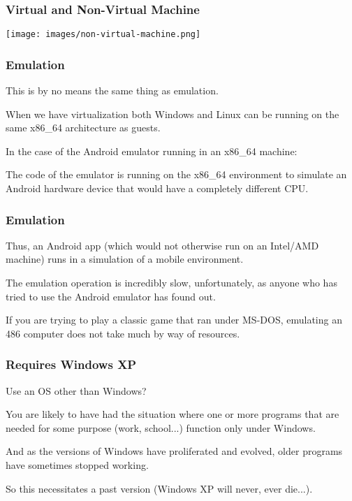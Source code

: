 \begin{frame}
\frametitle{Virtual and Non-Virtual Machine}

\begin{center}
	\texttt{[image: images/non-virtual-machine.png]}
\end{center}

\end{frame}

\begin{frame}
\frametitle{Emulation}

This is by no means the same thing as \alert{emulation}. 

When we have virtualization both Windows and Linux can be running on the same x86\_64 architecture as guests. 

In the case of the Android emulator running in an x86\_64 machine: 

The code of the emulator is running on the x86\_64 environment to simulate an Android hardware device that would have a completely different CPU. 

\end{frame}

\begin{frame}
\frametitle{Emulation}

Thus, an Android app (which would not otherwise run on an Intel/AMD machine) runs in a simulation of a mobile environment. 

The emulation operation is incredibly slow, unfortunately, as anyone who has tried to use the Android emulator has found out. 

If you are trying to play a classic game that ran under MS-DOS, emulating an 486 computer does not take much by way of resources.



\end{frame}

\begin{frame}
\frametitle{Requires Windows XP}

Use an OS other than Windows? 

You are likely to have had the situation where one or more programs that are needed for some purpose (work, school...) function only under Windows. 

And as the versions of Windows have proliferated and evolved, older programs have sometimes stopped working.

So this necessitates a past version (Windows XP will never, ever die...).

\end{frame}

